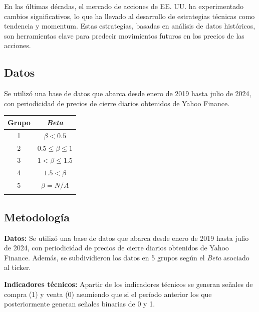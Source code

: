 \documentclass[a0,portrait]{a0poster}
\newcommand{\customsection}[1]{
    \begin{center}
        \begin{tcolorbox}[colframe=miRojo!50, colback=miRojo, width=\linewidth, boxrule=1mm, arc=3mm, auto outer arc]
            \centering
            \vspace{.5cm} %
            \color{white}
            \section*{ \textbf{\Huge #1}}  %
            \vspace{.5cm} %
        \end{tcolorbox}
    \end{center}
}
\begin{document}
\begin{multicols}{2}
     En las últimas décadas, el mercado de acciones de EE. UU. ha experimentado cambios significativos, lo que ha llevado al
      desarrollo de estrategias técnicas como tendencia y momentum. Estas estrategias, basadas en análisis de datos históricos, 
      son herramientas clave para predecir movimientos futuros en los precios de las acciones.
    \customsection{Datos}
    \par
    Se utilizó una base de datos que abarca desde enero de 2019 hasta julio de 2024, con periodicidad de precios de cierre 
    diarios obtenidos de Yahoo Finance.\\
    \begin{minipage}{.984\linewidth}
        \centering
        \vspace{1cm}
        \begin{tabular}{cc}
            \toprule
            \textbf{Grupo} & \textbf{\textit{Beta}}  \\
            \midrule
            1   &  $\beta < 0.5$                      \\
            2       & $0.5 \leq \beta \leq 1$    \\
            3      & $1 < \beta \leq 1.5$    \\
            4       & $1.5 < \beta $    \\
            5       & $\beta =N/A$    \\
            \bottomrule
            \vspace{.5cm}
        \end{tabular}
        \end{minipage}
    \customsection{Metodología}
    \par
    \textbf{Datos:} Se utilizó una base de datos que abarca desde enero de 2019 hasta julio de 2024, con periodicidad de precios
     de cierre diarios obtenidos de Yahoo Finance. Además, se subdividieron los datos en 5 grupos según el \textit{Beta} asociado al ticker.  
    \par
    \textbf{Indicadores técnicos:} Apartir de los indicadores técnicos se generan señales de compra (1) y venta (0) asumiendo que si el período anterior
     los que posteriormente generan señales binarias de 0 y 1.\\
     \begin{minipage}{.984\linewidth}
        \centering
        \vspace{1cm}

\end{minipage}
\end{multicols}
\end{document}
